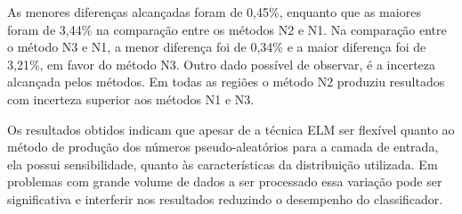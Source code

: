 \begin{apendicesenv}
As menores diferenças alcançadas foram de 0,45\%, enquanto que as maiores foram de 3,44\% na comparação entre os métodos N2 e N1. Na comparação entre o método N3 e N1, a menor diferença foi de 0,34\% e a maior diferença foi de 3,21\%, em favor do método N3. Outro dado possível de observar, é a incerteza alcançada pelos métodos. Em todas as regiões o método N2 produziu resultados com incerteza superior aos métodos N1 e N3.

Os resultados obtidos indicam que apesar de a técnica ELM ser flexível quanto ao método de produção dos números pseudo-aleatórios para a camada de entrada, ela possui sensibilidade, quanto às características da distribuição utilizada. Em problemas com grande volume de dados a ser processado essa variação pode ser significativa e interferir nos resultados reduzindo o desempenho do classificador.

%
\end{apendicesenv}
